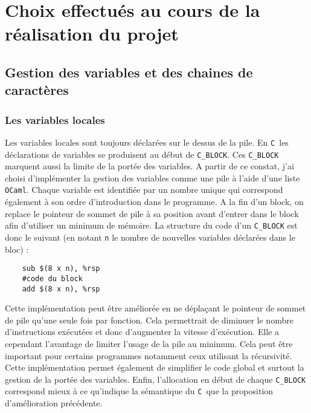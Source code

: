 \documentclass[11pt]{article}
\newcommand{\Cmm}{\texttt{C\textminus\textminus\ }}
\newcommand{\ttt}[1]{\texttt{#1}}
\begin{document}
\newpage
\section{Choix effectués au cours de la réalisation du projet}
\subsection{Gestion des variables et des chaines de caractères}
\subsubsection{Les variables locales}
Les variables locales sont toujours déclarées sur le dessus de la pile.
En \Cmm les déclarations de variables se produisent au début de \ttt{C\_BLOCK}.
Ces \ttt{C\_BLOCK} marquent aussi la limite de la portée des variables.
A partir de ce constat, j'ai choisi d'implémenter la gestion des variables comme une pile à l'aide d'une liste \ttt{OCaml}.
Chaque variable est identifiée par un nombre unique qui correspond également à son ordre d'introduction dans le programme.
A la fin d'un block, on replace le pointeur de sommet de pile à sa position avant d'entrer dans le block afin d'utiliser un minimum de mémoire.
La structure du code d'un \ttt{C\_BLOCK} est donc le suivant (en notant \ttt{n} le nombre de nouvelles variables déclarées dans le bloc) :
\begin{lstlisting}
    sub $(8 x n), %rsp
    #code du block
    add $(8 x n), %rsp
\end{lstlisting}
Cette implémentation peut être améliorée en ne déplaçant le pointeur de sommet de pile qu’une seule fois par fonction.
Cela permettrait de diminuer le nombre d'instructions exécutées et donc d'augmenter la vitesse d'exécution.
Elle a cependant l'avantage de limiter l'usage de la pile au minimum.
Cela peut être important pour certains programmes notamment ceux utilisant la récursivité.
Cette implémentation permet également de simplifier le code global et surtout la gestion de la portée des variables.
Enfin, l'allocation en début de chaque \ttt{C\_BLOCK} correspond mieux à ce qu'indique la sémantique du \Cmm que la proposition d'amélioration précédente.
\end{document}
